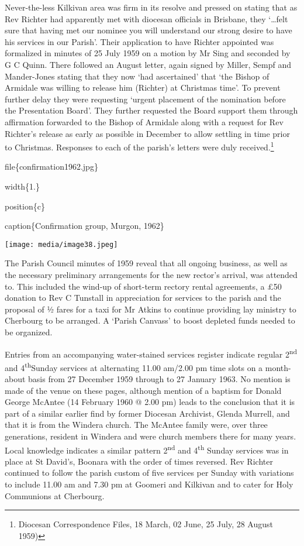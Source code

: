Never-the-less Kilkivan area was firm in its resolve and pressed on stating that as Rev Richter had apparently met with diocesan officials in Brisbane, they `\ldots felt sure that having met our nominee you will understand our strong desire to have his services in our Parish'. Their application to have Richter appointed was formalized in minutes of 25 July 1959 on a motion by Mr Sing and seconded by G C Quinn. There followed an August letter, again signed by Miller, Sempf and Mander-Jones stating that they now `had ascertained' that `the Bishop of Armidale was willing to release him (Richter) at Christmas time'. To prevent further delay they were requesting `urgent placement of the nomination before the Presentation Board'. They further requested the Board support them through affirmation forwarded to the Bishop of Armidale along with a request for Rev Richter's release as early as possible in December to allow settling in time prior to Christmas. Responses to each of the parish's letters were duly received.\footnote{Diocesan Correspondence Files, 18 March, 02 June, 25 July, 28 August 1959)}

file\{confirmation1962.jpg\}

width\{1.\}

position\{c\}

caption\{Confirmation group, Murgon, 1962\}

\texttt{[image: media/image38.jpeg]}

The Parish Council minutes of 1959 reveal that all ongoing business, as well as the necessary preliminary arrangements for the new rector's arrival, was attended to. This included the wind-up of short-term rectory rental agreements, a £50 donation to Rev C Tunstall in appreciation for services to the parish and the proposal of ½ fares for a taxi for Mr Atkins to continue providing lay ministry to Cherbourg to be arranged. A `Parish Canvass' to boost depleted funds needed to be organized.

Entries from an accompanying water-stained services register indicate regular 2\textsuperscript{nd} and 4\textsuperscript{th}Sunday services at alternating 11.00 am/2.00 pm time slots on a month-about basis from 27 December 1959 through to 27 January 1963. No mention is made of the venue on these pages, although mention of a baptism for Donald George McAntee (14 February 1960 @ 2.00 pm) leads to the conclusion that it is part of a similar earlier find by former Diocesan Archivist, Glenda Murrell, and that it is from the Windera church. The McAntee family were, over three generations, resident in Windera and were church members there for many years. Local knowledge indicates a similar pattern 2\textsuperscript{nd} and 4\textsuperscript{th} Sunday services was in place at St David's, Boonara with the order of times reversed. Rev Richter continued to follow the parish custom of five services per Sunday with variations to include 11.00 am and 7.30 pm at Goomeri and Kilkivan and to cater for Holy Communions at Cherbourg.

